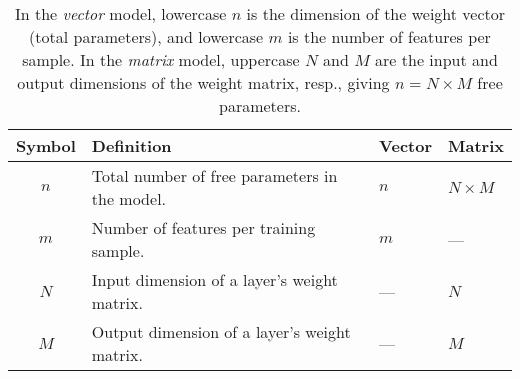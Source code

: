 \begin{table}[H]
\centering
\begin{tabular}{c|l|l|l}
\toprule
\textbf{Symbol} & \textbf{Definition} & \textbf{Vector} & \textbf{Matrix} \\
\midrule
$n$ & Total number of free parameters in the model. & $n$ & $N \times M$ \\
$m$ & Number of features per training sample. & $m$ & --- \\
$N$ & Input dimension of a layer’s weight matrix. & --- & $N$ \\
$M$ & Output dimension of a layer’s weight matrix. & --- & $M$ \\
\bottomrule
\end{tabular}
\caption{In the \emph{vector} model, lowercase $n$ is the dimension of the weight vector (total parameters), and lowercase $m$ is the number of features per sample. In the \emph{matrix} model, uppercase $N$ and $M$ are the input and output dimensions of the weight matrix, resp., giving $n=N\times M$ free parameters.}
\label{tab:dim_notation}
\end{table}

